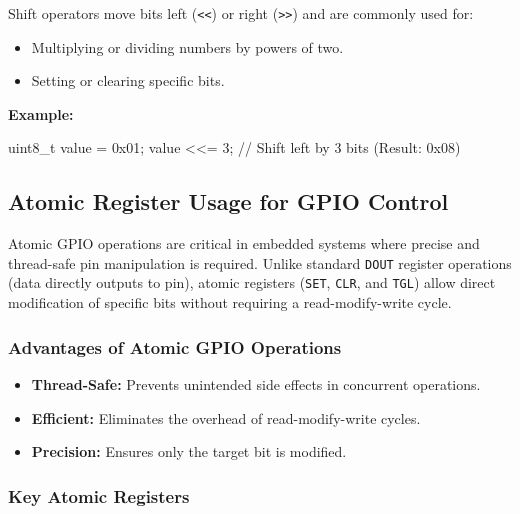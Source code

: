 \documentclass[
  9pt,
  letterpaper,
  abstract,
  titlepage]{scrbook}
\newenvironment{Shaded}{\begin{snugshade}}{\end{snugshade}}
\newcommand{\BaseNTok}[1]{\textcolor[rgb]{0.68,0.00,0.00}{#1}}
\newcommand{\CommentTok}[1]{\textcolor[rgb]{0.37,0.37,0.37}{#1}}
\newcommand{\DataTypeTok}[1]{\textcolor[rgb]{0.68,0.00,0.00}{#1}}
\newcommand{\DecValTok}[1]{\textcolor[rgb]{0.68,0.00,0.00}{#1}}
\newcommand{\NormalTok}[1]{\textcolor[rgb]{0.00,0.23,0.31}{#1}}
\newcommand{\OperatorTok}[1]{\textcolor[rgb]{0.37,0.37,0.37}{#1}}
\begin{document}
Shift operators move bits left (\texttt{\textless{}\textless{}}) or
right (\texttt{\textgreater{}\textgreater{}}) and are commonly used for:

\begin{itemize}
\item
  Multiplying or dividing numbers by powers of two.
\item
  Setting or clearing specific bits.
\end{itemize}

\textbf{Example:}

\begin{Shaded}
\begin{Highlighting}[]
\DataTypeTok{uint8\_t}\NormalTok{ value }\OperatorTok{=} \BaseNTok{0x01}\OperatorTok{;}
\NormalTok{value }\OperatorTok{\textless{}\textless{}=} \DecValTok{3}\OperatorTok{;} \CommentTok{// Shift left by 3 bits (Result: 0x08)}
\end{Highlighting}
\end{Shaded}

\subsection{Atomic Register Usage for GPIO
Control}\label{atomic-register-usage-for-gpio-control}

Atomic GPIO operations are critical in embedded systems where precise
and thread-safe pin manipulation is required. Unlike standard
\texttt{DOUT} register operations (data directly outputs to pin), atomic
registers (\texttt{SET}, \texttt{CLR}, and \texttt{TGL}) allow direct
modification of specific bits without requiring a read-modify-write
cycle.

\subsubsection{Advantages of Atomic GPIO
Operations}\label{advantages-of-atomic-gpio-operations}

\begin{itemize}
\item
  \textbf{Thread-Safe:} Prevents unintended side effects in concurrent
  operations.
\item
  \textbf{Efficient:} Eliminates the overhead of read-modify-write
  cycles.
\item
  \textbf{Precision:} Ensures only the target bit is modified.
\end{itemize}

\subsubsection{Key Atomic Registers}\label{key-atomic-registers}
\end{document}
